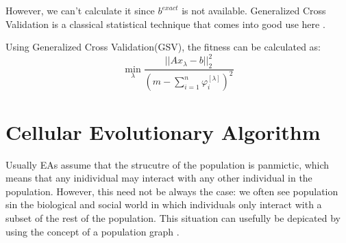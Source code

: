 \documentclass{article}
\begin{document}
However, we can't calculate it since \(b^{exact}\) is not available. Generalized 
Cross Validation is a classical statistical technique that comes into good use
here \cite{hansen2010discrete}.

Using Generalized Cross Validation(GSV), the fitness can be calculated as:
\begin{equation}
	\mathop {\min }\limits_\lambda  \frac{{||A{x_\lambda } - b||_2^2}}{{{{(m -
	\sum\nolimits_{i = 1}^n {\varphi _i^{[\lambda ]}} )}^2}}}
\end{equation}

\section{Cellular Evolutionary Algorithm}
Usually EAs assume that the strucutre of the population is panmictic, which
means that any inidividual may interact with any other individual in the
population.
However, this need not be always the case: we often see population sin the
biological and social world in which individuals only interact with a subset of
the rest of the population. This situation can usefully be depicated by using
the concept of a population graph \cite{hoekstra2010simulating}.
\end{document}

